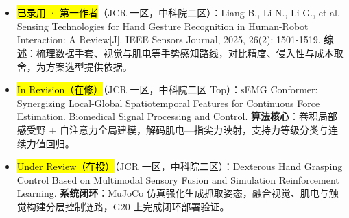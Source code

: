 \section[论文与研究成果]{}
\begin{itemize}
    \item \hl{已录用 · 第一作者}（JCR 一区，中科院二区）：Liang B., Li N., Li G., et al. Sensing Technologies for Hand Gesture Recognition in Human-Robot Interaction: A Review[J]. IEEE Sensors Journal, 2025, 26(2): 1501-1519. \textbf{综述}：梳理数据手套、视觉与肌电等手势感知路线，对比精度、侵入性与成本取舍，为方案选型提供依据。
    \item \hl{In Revision（在修）}（JCR 一区，中科院二区 Top）：sEMG Conformer: Synergizing Local-Global Spatiotemporal Features for Continuous Force Estimation. Biomedical Signal Processing and Control. \textbf{算法核心}：卷积局部感受野 + 自注意力全局建模，解码肌电—指尖力映射，支持力等级分类与连续力值回归。
    \item \hl{Under Review（在投）}（JCR 一区，中科院二区）：Dexterous Hand Grasping Control Based on Multimodal Sensory Fusion and Simulation Reinforcement Learning. \textbf{系统闭环}：MuJoCo 仿真强化生成抓取姿态，融合视觉、肌电与触觉构建分层控制链路，G20 上完成闭环部署验证。
\end{itemize}


